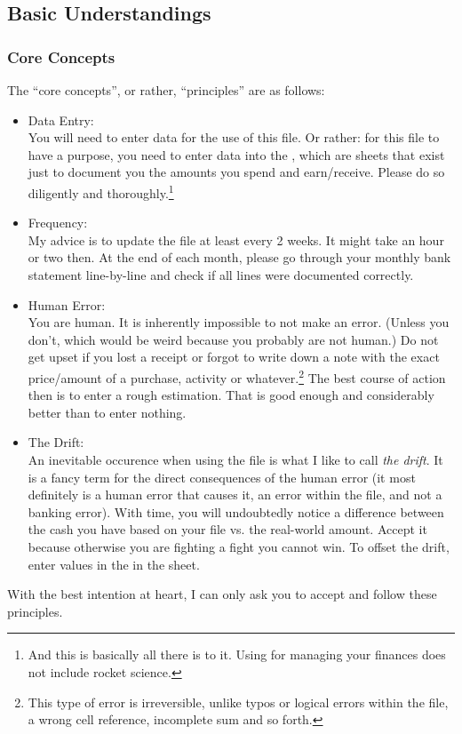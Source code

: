 \subsection{Basic Understandings}
\label{subsec:basic-understandings}

\subsubsection{Core Concepts}
\label{subsubsec:core-concepts}

The ``core concepts'', or rather, ``principles'' are as follows:
\begin{itemize}
	\item Data Entry:\\
	You will need to enter data for the use of this file.
	Or rather: for this file to have a purpose, you need to enter data into the , which are sheets that exist just to document you the amounts you spend and earn/receive.
	Please do so diligently and thoroughly.\footnote{And this is basically all there is to it.
	Using \tfn for managing your finances does not include rocket science.}
	\item Frequency:\\
	My advice is to update the file at least every 2 weeks.
	It might take an hour or two then.
	At the end of each month, please go through your monthly bank statement line-by-line and check if all lines were documented correctly.
	\item Human Error:\\
	You are human.
	It is inherently impossible to not make an error.
	(Unless you don't, which would be weird because you probably are not human.)
	Do not get upset if you lost a receipt or forgot to write down a note with the exact price/amount of a purchase, activity or whatever.\footnote{This type of error is irreversible, unlike typos or logical errors within the file, \eg a wrong cell reference, incomplete sum and so forth.}
	The best course of action then is to enter a rough estimation.
	That is good enough and considerably better than to enter nothing.
	\item The Drift:\\
	An inevitable occurence when using the file is what I like to call \emph{the drift}.
	It is a fancy term for the direct consequences of the human error (it most definitely is a human error that causes it, \ie an error within the file, and not a banking error).
	With time, you will undoubtedly notice a difference between the cash you have based on your file vs. the real-world amount.
	Accept it because otherwise you are fighting a fight you cannot win.
	To offset the drift, enter values in the  in the  sheet.
\end{itemize}
With the best intention at heart, I can only ask you to accept and follow these principles.

